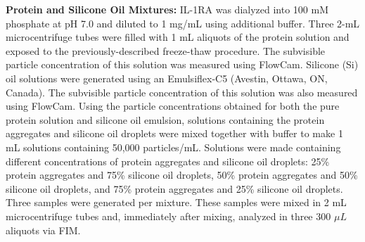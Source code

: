 \documentclass[%
reprint,
superscriptaddress,
 aps,
 pre,
]{revtex4-1}
\begin{document}
\noindent  \textbf{Protein and Silicone Oil Mixtures:} IL-1RA was dialyzed into 100 mM phosphate at pH 7.0 and diluted to 1 mg/mL using additional buffer. Three 2-mL microcentrifuge tubes were filled with 1 mL aliquots of the protein solution and exposed to the previously-described freeze-thaw procedure. The subvisible particle concentration of this solution was measured using FlowCam\textsuperscript{\textregistered}. Silicone (Si) oil solutions were generated using an Emulsiflex-C5 (Avestin, Ottawa, ON, Canada). The subvisible particle concentration of this solution was also measured  using FlowCam\textsuperscript{\textregistered}.
Using the particle concentrations obtained for both the pure protein solution and silicone oil emulsion, solutions containing the protein aggregates and silicone oil droplets were mixed together with buffer to make 1 mL solutions containing 50,000 particles/mL. Solutions were made containing different concentrations of protein aggregates and silicone oil droplets: 25\% protein aggregates and 75\% silicone oil droplets, 50\% protein aggregates and 50\% silicone oil droplets, and 75\% protein aggregates and 25\% silicone oil droplets. Three samples were generated per mixture. These samples were mixed in 2 mL microcentrifuge tubes and, immediately after mixing, analyzed in three 300 $\mu L$ aliquots via FIM.









\end{document}
